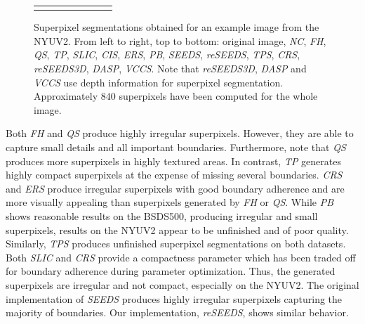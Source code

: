 \documentclass[runningheads]{llncs}
\begin{document}
\begin{figure}[b]
\begin{tabularx}{\linewidth}{@{}Y@{}Y@{}Y@{}Y@{}Y@{}Y@{}Y@{}Y@{}}
{            }
            &
        \end{tabularx}
        \vspace{-2.5mm}
        \caption{Superpixel segmentations obtained for an example image from the NYUV2. From left to right, top to bottom: original image, \textit{NC}, \textit{FH}, \textit{QS}, \textit{TP}, \textit{SLIC}, \textit{CIS}, \textit{ERS}, \textit{PB}, \textit{SEEDS}, \textit{reSEEDS}, \textit{TPS}, \textit{CRS}, \textit{reSEEDS3D}, \textit{DASP}, \textit{VCCS}. Note that \textit{reSEEDS3D}, \textit{DASP} and \textit{VCCS} use depth information for superpixel segmentation. Approximately $840$ superpixels have been computed for the whole image.}
        \label{fig:qualitative-nyu}
    \end{figure}
    
    Both \textit{FH} and \textit{QS} produce highly irregular superpixels. However, they are able to capture small details and all important boundaries. Furthermore, note that \textit{QS} produces more superpixels in highly textured areas. In contrast, \textit{TP} generates highly compact superpixels at the expense of missing several boundaries. \textit{CRS} and \textit{ERS} produce irregular superpixels with good boundary adherence and are more visually appealing than superpixels generated by \textit{FH} or \textit{QS}. While \textit{PB} shows reasonable results on the BSDS500, producing irregular and small superpixels, results on the NYUV2 appear to be unfinished and of poor quality. Similarly, \textit{TPS} produces unfinished superpixel segmentations on both datasets. Both \textit{SLIC} and \textit{CRS} provide a compactness parameter which has been traded off for boundary adherence during parameter optimization. Thus, the generated superpixels are irregular and not compact, especially on the NYUV2. The original implementation of \textit{SEEDS} produces highly irregular superpixels capturing the majority of boundaries. Our implementation, \textit{reSEEDS}, shows similar behavior.
    
\end{document}
